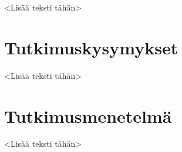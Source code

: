 <Lisää teksti tähän>

\section{Tutkimuskysymykset}

<Lisää teksti tähän>

\section{Tutkimusmenetelmä}

<Lisää teksti tähän>
